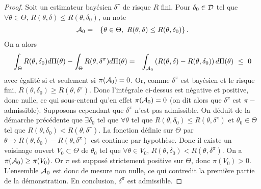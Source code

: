 \begin{proof}%
Soit un estimateur bayésien $\delta^{\pi}$ de risque $R$ fini. Pour $\delta_0\in{\cal{D}}$ tel que $\forall\theta\in\Theta$, $R(\theta,\delta)\leq R(\theta,\delta_0)$, on note
\begin{eqnarray*}
{\cal{A}}_0 & = & \left\{\theta\in\Theta, \ R(\theta,\delta) \leq R(\theta,\delta_0) \right\}.
\end{eqnarray*}
On a alors
\begin{eqnarray*}
\int_{\Theta} R(\theta,\delta_0) d\Pi(\theta) - \int_{\Theta} R(\theta,\delta^{\pi}) d\Pi(\theta)& = & \int_{{\cal{A}}_0} \left(R(\theta,\delta)-R(\theta,\delta_0)\right)  d\Pi(\theta) \ \leq\ 0 
\end{eqnarray*}
avec égalité si et seulement si $\pi({\cal{A}}_0)=0$. Or, comme $\delta^{\pi}$ est bayésien et le risque fini, $R(\theta,\delta_0)\geq R(\theta,\delta^{\pi})$. Donc l'intégrale ci-dessus est négative et positive, donc nulle, ce qui sous-entend qu'en effet $\pi({\cal{A}}_0)=0$ (on dit alors que $\delta^{\pi}$ est $\pi-$admissible). Supposons cependant que $\delta^{\pi}$ n'est pas admissible. On  déduit de la démarche précédente que  $\exists\delta_0$ tel que $\forall \theta$ tel que $R(\theta,\delta_0)\leq R(\theta,\delta^{\pi})$ et $\theta_0\in\Theta$ tel que $R(\theta,\delta_0) < R(\theta,\delta^{\pi})$. La fonction définie sur $\Theta$ par $\theta\to R(\theta,\delta_0)-R(\theta,\delta^{\pi})$ est continue par hypothèse. Donc il existe un voisinage  ouvert $V_0\subset\Theta$ de $\theta_0$ tel que $\forall \theta\in V_0$, $R(\theta,\delta_0)<R(\theta,\delta^{\pi})$. On a  $\pi({\cal{A}}_0)\geq \pi(V_0)$. Or $\pi$ est supposé strictement positive sur $\Theta$, donc $\pi(V_0)>0$. L'ensemble ${\cal{A}}_0$ est donc de mesure non nulle, ce qui contredit la première partie de la démonstration. En conclusion, $\delta^{\pi}$ est admissible. 
\end{proof}
